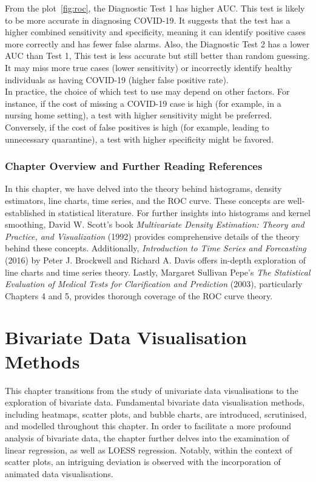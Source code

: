 \documentclass{article}\usepackage[]{graphicx}\usepackage[]{xcolor}
\numberwithin{equation}{section}
\begin{document}
\noindent
From the plot~\ref{fig:roc}, the Diagnostic Test 1 has higher AUC. This test is likely to be more accurate in diagnosing COVID-19. It suggests that the test has a higher combined sensitivity and specificity, meaning it can identify positive cases more correctly and has fewer false alarms. Also, the Diagnostic Test 2 has a lower AUC than Test 1, This test is less accurate but still better than random guessing. It may miss more true cases (lower sensitivity) or incorrectly identify healthy individuals as having COVID-19 (higher false positive rate).\\

\noindent
In practice, the choice of which test to use may depend on other factors. For instance, if the cost of missing a COVID-19 case is high (for example, in a nursing home setting), a test with higher sensitivity might be preferred. Conversely, if the cost of false positives is high (for example, leading to unnecessary quarantine), a test with higher specificity might be favored.

\subsubsection*{Chapter Overview and Further Reading References}

\noindent In this chapter, we have delved into the theory behind histograms, density estimators, line charts, time series, and the ROC curve. These concepts are well-established in statistical literature. For further insights into histograms and kernel smoothing, David W. Scott's book \textit{Multivariate Density Estimation: Theory and Practice, and Visualization} (1992) provides comprehensive details of the theory behind these concepts. Additionally, \textit{Introduction to Time Series and Forecasting} (2016) by Peter J. Brockwell and Richard A. Davis offers in-depth exploration of line charts and time series theory. Lastly, Margaret Sullivan Pepe's \textit{The Statistical Evaluation of Medical Tests for Clarification and Prediction} (2003), particularly Chapters 4 and 5, provides thorough coverage of the ROC curve theory. 

\newpage

\section{Bivariate Data Visualisation Methods}

\noindent This chapter transitions from the study of univariate data visualisations to the exploration of bivariate data. Fundamental bivariate data visualisation methods, including heatmaps, scatter plots, and bubble charts, are introduced, scrutinised, and modelled throughout this chapter. In order to facilitate a more profound analysis of bivariate data, the chapter further delves into the examination of linear regression, as well as LOESS regression. Notably, within the context of scatter plots, an intriguing deviation is observed with the incorporation of animated data visualisations.
\end{document}

